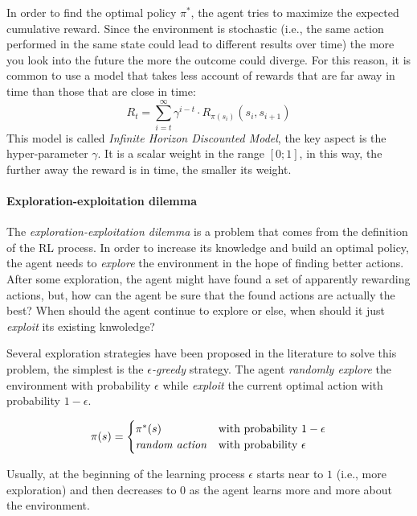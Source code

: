 \documentclass[12pt,a4paper,openright,twoside]{book}
\begin{document}
In order to find the optimal policy $\pi^*$, the agent tries to maximize the expected cumulative reward.
    Since the environment is stochastic (i.e., the same action performed in the same state could lead to different 
    results over time) the more you look into the future the more the outcome could diverge.
    For this reason, it is common to use a model that takes less account of rewards that are far away in time 
    than those that are close in time:
    $$R_t = \sum_{i=t}^{\infty} \gamma^{i-t} \cdot R_{\pi(s_i)}(s_i, s_{i+1}) $$
    This model is called \emph{Infinite Horizon Discounted Model}, the key aspect is the hyper-parameter $\gamma$.
    It is a scalar weight in the range $[0;1]$, in this way, the further away the reward is in time, the smaller its weight.

\paragraph{Exploration-exploitation dilemma}

The \emph{exploration-exploitation dilemma} is a problem that comes from the definition of the RL process.
    In order to increase its knowledge and build an optimal policy, the agent needs to \emph{explore} the environment 
    in the hope of finding better actions. After some exploration, the agent might have found a set of 
    apparently rewarding actions, but, how can the agent be sure that the found actions are actually the best? 
    When should the agent continue to explore or else, when should it just \emph{exploit} its existing knwoledge?

Several exploration strategies have been proposed in the literature to solve this problem, the simplest is the
    \emph{$\epsilon$-greedy} strategy. The agent \emph{randomly explore} the environment with probability $\epsilon$
    while \emph{exploit} the current optimal action with probability $1-\epsilon$.

    $$
    \pi(s)=
    \begin{cases}
        \pi^*(s) & \text{with probability $1-\epsilon$} \\
        \text{\emph{random action}} & \text{with probability $\epsilon$}\\
    \end{cases} 
    $$ 

    Usually, at the beginning of the learning process $\epsilon$ starts near to $1$ (i.e., more exploration) and then decreases
    to $0$ as the agent learns more and more about the environment. 
\end{document}
